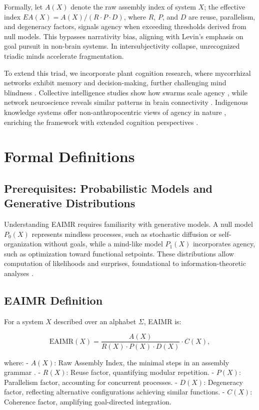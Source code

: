 \documentclass{article}
\begin{document}
Formally, let $A(X)$ denote the raw assembly index of system $X$; the effective index $EA(X) = A(X)/(R \cdot P \cdot D)$, where $R$, $P$, and $D$ are reuse, parallelism, and degeneracy factors, signals agency when exceeding thresholds derived from null models. This bypasses narrativity bias, aligning with Levin’s emphasis on goal pursuit in non-brain systems. In intersubjectivity collapse, unrecognized triadic minds accelerate fragmentation.

To extend this triad, we incorporate plant cognition research, where mycorrhizal networks exhibit memory and decision-making, further challenging mind blindness \citep{calvo2020plants}. Collective intelligence studies show how swarms scale agency \citep{camazine2001}, while network neuroscience reveals similar patterns in brain connectivity \citep{bassett2017network}. Indigenous knowledge systems offer non-anthropocentric views of agency in nature \citep{kimmerer2013braiding}, enriching the framework with extended cognition perspectives \citep{clark2010supersizing}.

\section{Formal Definitions}
\label{sec:formal}

\subsection{Prerequisites: Probabilistic Models and Generative Distributions}
Understanding EAIMR requires familiarity with generative models. A null model $P_0(X)$ represents mindless processes, such as stochastic diffusion or self-organization without goals, while a mind-like model $P_1(X)$ incorporates agency, such as optimization toward functional setpoints. These distributions allow computation of likelihoods and surprises, foundational to information-theoretic analyses \citep{cover2006}.

\subsection{EAIMR Definition}
For a system $X$ described over an alphabet $\Sigma$, EAIMR is:

\[ \mathrm{EAIMR}(X) = \frac{A(X)}{R(X) \cdot P(X) \cdot D(X)} \cdot C(X), \]

where:
- $A(X)$: Raw Assembly Index, the minimal steps in an assembly grammar \citep{walker2013}.
- $R(X)$: Reuse factor, quantifying modular repetition.
- $P(X)$: Parallelism factor, accounting for concurrent processes.
- $D(X)$: Degeneracy factor, reflecting alternative configurations achieving similar functions.
- $C(X)$: Coherence factor, amplifying goal-directed integration.
\end{document}
